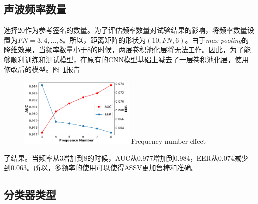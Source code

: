 \subsection{声波频率数量}
选择20作为参考签名的数量。为了评估频率数量对试验结果的影响，将频率数量设置为$FN=3, 4,..., 8$。所以，距离矩阵的形状为$(10, FN, 6)$。由于\textit{max pooling}的降维效果，当频率数量小于8的时候，两层卷积池化层将无法工作。因此，为了能够顺利训练和测试模型，在原有的CNN模型基础上减去了一层卷积池化层，使用修改后的模型。图~\ref{fig:frequency-number}报告
\begin{figure}[!htp]
  \centering
  \includegraphics[width=0.5\textwidth]{figure/multi_frequency_auc_eer.pdf}
      {Frequency number effect}
  \label{fig:frequency-number}
\end{figure}
了结果。当频率从3增加到8的时候，AUC从0.977增加到0.984，EER从0.074减少到0.063。所以，多频率的使用可以使得ASSV更加鲁棒和准确。

\subsection{分类器类型}

